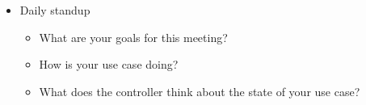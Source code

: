
\begin{itemize}
    \item Daily standup
    \begin{itemize}
        \item What are your goals for this meeting?
        \item How is your use case doing?
        \item What does the controller think about the state of your use case?
    \end{itemize}
\end{itemize}
